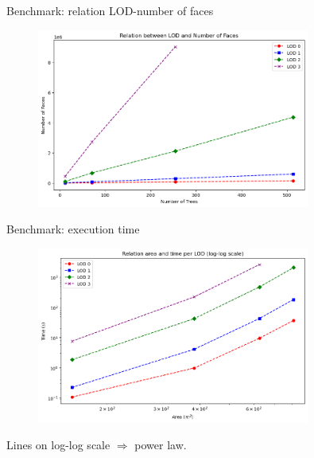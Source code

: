 \documentclass[10pt]{beamer}
\begin{document}
\begin{frame}{Benchmark: relation LOD-number of faces}
  \begin{figure}[H]
    \centering
    \includegraphics[width=0.8\textwidth]{images/lod_vs_faces.png}
\end{figure}
\end{frame}

\begin{frame}{Benchmark: execution time}
  \begin{figure}[H]
    \centering
    \includegraphics[width=0.8\textwidth]{images/lod_vs_time.png}
\end{figure}
Lines on log-log scale $\Longrightarrow$ power law.
\end{frame}






\end{document}
